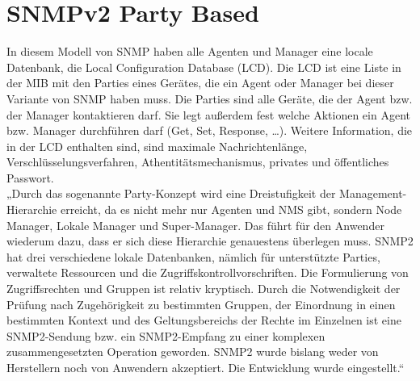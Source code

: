 \documentclass[11pt,a4paper]{article}
\begin{document}
\section{SNMPv2 Party Based}
In diesem Modell von SNMP haben alle Agenten und Manager eine locale Datenbank, die Local Configuration Database (LCD). Die LCD ist eine Liste in der MIB mit den Parties eines Gerätes, die ein Agent oder Manager bei dieser Variante von SNMP haben muss. Die Parties sind alle Geräte, die der Agent bzw. der Manager kontaktieren darf. Sie legt außerdem fest welche Aktionen ein Agent bzw. Manager durchführen darf (Get, Set, Response, …). Weitere Information, die in der LCD enthalten sind, sind maximale Nachrichtenlänge, Verschlüsselungsverfahren, Athentitätsmechanismus, privates und öffentliches Passwort.\\
„Durch das sogenannte Party-Konzept wird eine Dreistufigkeit der Management-Hierarchie erreicht, da es nicht mehr nur Agenten und NMS gibt, sondern Node Manager, Lokale Manager und Super-Manager. Das führt für den Anwender wiederum dazu, dass er sich diese Hierarchie genauestens überlegen muss. SNMP2 hat drei verschiedene lokale Datenbanken, nämlich für unterstützte Parties, verwaltete Ressourcen und die Zugriffskontrollvorschriften. Die Formulierung von Zugriffsrechten und Gruppen ist relativ kryptisch. Durch die Notwendigkeit der Prüfung nach Zugehörigkeit zu bestimmten Gruppen, der Einordnung in einen bestimmten Kontext und des Geltungsbereichs der Rechte im Einzelnen ist eine SNMP2-Sendung bzw. ein SNMP2-Empfang zu einer komplexen zusammengesetzten Operation geworden. SNMP2 wurde bislang weder von Herstellern noch von Anwendern akzeptiert. Die Entwicklung wurde eingestellt.“
\cite{snmpv2PartyBased}\\
\end{document}
